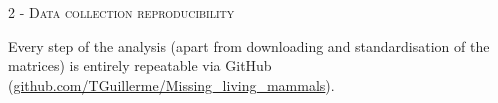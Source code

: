\documentclass[12pt,letterpaper]{article}
\renewcommand{\section}[1]{%
\bigskip
\begin{center}
\begin{Large}
\normalfont\scshape #1
\medskip
\end{Large}
\end{center}}
\begin{document}
\section{2 - Data collection reproducibility}
Every step of the analysis (apart from downloading and standardisation of the matrices) is entirely repeatable via GitHub (\url{github.com/TGuillerme/Missing_living_mammals}).

\newpage



\end{document}
